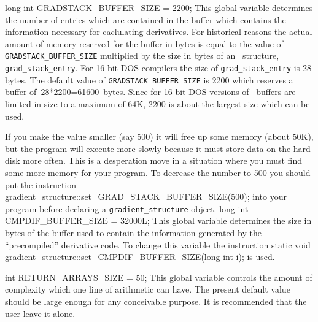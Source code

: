 \documentclass[12pt]{book}
\begin{document}
\beginexample
long int GRADSTACK\_BUFFER\_SIZE = 2200;  
\endexample
{}  
\noindent 
This global variable determines the number of entries which are contained in
the buffer which contains the information necessary for caclulating 
derivatives. For historical reasons the actual amount of memory reserved for the buffer in bytes is equal to the value of
{\tt GRADSTACK\_BUFFER\_SIZE} 
multiplied by the size in bytes of an \AD\ structure,
{\tt grad\_stack\_entry}. For 16 bit DOS compilers the size of
{\tt grad\_stack\_entry} is 28 bytes. The default value of 
{\tt GRADSTACK\_BUFFER\_SIZE} is 2200 which reserves a buffer 
of~28*2200=61600~bytes.  Since for 16 bit DOS versions of \AD\ buffers 
are limited in size
to a maximum of 64K, 2200 is about the largest size which can be used.

If you make the value smaller (say 500) 
it will free up some memory (about 50K),
but the program will execute more slowly because it must store
data on the hard disk more often. This is a desperation move
in a situation where you must find some more memory for your program. 
To decrease the number to 500 you should put the instruction
\beginexample
gradient\_structure::set\_GRAD\_STACK\_BUFFER\_SIZE(500);  
\endexample
\noindent 
into your program before declaring a {\tt gradient\_structure} object.
\beginexample
long int CMPDIF_BUFFER_SIZE = 32000L;  
\endexample
This global variable determines the size in bytes of the buffer used to contain
the information generated by the ``precompiled'' derivative code.
To change this variable the instruction
\beginexample
static void gradient\_structure::set\_CMPDIF\_BUFFER\_SIZE(long int i);
\endexample
\noindent is used.

\bestbreak
\beginexample
int RETURN_ARRAYS_SIZE = 50;  
\endexample
{}  
\noindent This global variable controls the amount of complexity which one
line of arithmetic can have. The present default value should 
be large enough for any
conceivable purpose. It is recommended that the user leave it alone.
\end{document}
